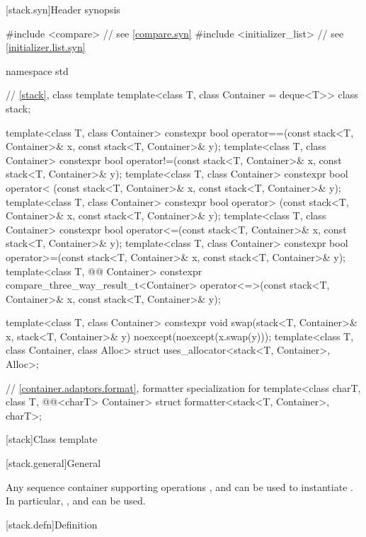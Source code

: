 [stack.syn]{Header  synopsis}

%
\begin{codeblock}
#include <compare>              // see \ref{compare.syn}
#include <initializer_list>     // see \ref{initializer.list.syn}

namespace std {
  // \ref{stack}, class template 
  template<class T, class Container = deque<T>> class stack;

  template<class T, class Container>
    constexpr bool operator==(const stack<T, Container>& x, const stack<T, Container>& y);
  template<class T, class Container>
    constexpr bool operator!=(const stack<T, Container>& x, const stack<T, Container>& y);
  template<class T, class Container>
   constexpr  bool operator< (const stack<T, Container>& x, const stack<T, Container>& y);
  template<class T, class Container>
    constexpr bool operator> (const stack<T, Container>& x, const stack<T, Container>& y);
  template<class T, class Container>
    constexpr bool operator<=(const stack<T, Container>& x, const stack<T, Container>& y);
  template<class T, class Container>
    constexpr bool operator>=(const stack<T, Container>& x, const stack<T, Container>& y);
  template<class T, @@ Container>
    constexpr compare_three_way_result_t<Container>
      operator<=>(const stack<T, Container>& x, const stack<T, Container>& y);

  template<class T, class Container>
    constexpr void swap(stack<T, Container>& x, stack<T, Container>& y)
      noexcept(noexcept(x.swap(y)));
  template<class T, class Container, class Alloc>
    struct uses_allocator<stack<T, Container>, Alloc>;

  // \ref{container.adaptors.format}, formatter specialization for 
  template<class charT, class T, @@<charT> Container>
    struct formatter<stack<T, Container>, charT>;
}
\end{codeblock}

[stack]{Class template }

[stack.general]{General}

\pnum
{}%
Any sequence container supporting operations
,
and
can be used to instantiate
.
In particular,
,
and
can be used.

[stack.defn]{Definition}

